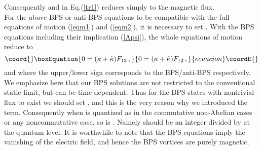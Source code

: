 \documentclass[a4paper,12pt]{article}
\def\const{{\tilde{\kappa}}}
\begin{document}
Consequently  \coordHE{} and \coordHE{}  in
Eq.(\ref{tr1}) reduces simply to the magnetic flux. \\


For the above BPS or anti-BPS equations to be compatible with the full equations of motion (\ref{eqm1}) and
(\ref{eqm2}),   it is necessary to set \myHighlight{$\const+\kappa=0$}\coordHE{}. With the BPS equations including their implication
(\ref{Apsi}),  the whole equations of motion  reduce  to
\begin{equation}\coord{}\boxEquation{
0=(\kappa+\const)F_{12}\,,
\label{redeqm}
}{
0=(\kappa+\const)F_{12}\,,
}{ecuacion}\coordE{}\end{equation}
and \coordHE{} where the upper/lower sign corresponds to the BPS/anti-BPS respectively. We emphasize here that
our BPS solutions are not restricted to the conventional static limit, but can be time dependent. Thus for the BPS states
with nontrivial flux to exist we should set \myHighlight{$\const=-\kappa$}\coordHE{}, and this is the very reason why we introduced the
\myHighlight{$\tilde{\kappa}$}\coordHE{} term.  Consequently when \myHighlight{$\kappa$}\coordHE{} is quantized as in the commutative non-Abelian cases or any
noncommutative case, so is  \myHighlight{$\const$}\coordHE{}.  Namely  \myHighlight{$\const$}\coordHE{}  should be an integer divided by \myHighlight{$2\pi$}\coordHE{}   at the quantum level.
It is worthwhile to note that the BPS equations imply the vanishing of the electric field,  \coordHE{} and hence the BPS
vortices  are purely magnetic. \newline


\end{document}
